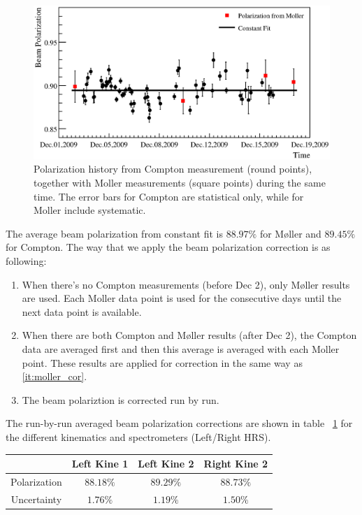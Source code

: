 \begin{figure}[!ht]
\centering
\includegraphics{RM/comptonpol.eps}
\caption{Polarization history from Compton measurement (round points), 
together with Moller measurements (square points) during the same time. 
The error bars for Compton are statistical only, while for Moller include systematic.}
\label{fig:compton}
\end{figure}

The average beam polarization from constant fit is $88.97\%$ for M{\o}ller and $89.45\%$ for Compton. 
The way that we apply the beam polarization correction is as following:

\begin{enumerate}
\item{ \label{it:moller_cor} When there's no Compton measurements (before Dec 2), 
only M{\o}ller results are used. Each Moller data point is used for the 
consecutive days until the next data point is available.}

\item{ When there are both Compton and M{\o}ller results (after Dec 2), 
the Compton data are averaged first and then this average is 
averaged with each Moller point. These results are applied 
for correction in the same way as \ref{it:moller_cor}.}

\item {The beam polariztion is corrected run by run. }
\end{enumerate}

The run-by-run averaged beam polarization corrections are shown in 
table ~\ref{tab:polarimeter} for the different kinematics and
spectrometers (Left/Right HRS).

\begin{table}[!ht]
  \begin{center}
    \begin{tabular}{c|c|c|c}
      \hline\hline
                    &  Left Kine 1   &    Left Kine 2    & Right Kine 2 \\ \hline
      Polarization  &  $88.18\%$      &    $89.29\%$       & $88.73\%$  \\ \hline
      Uncertainty   &  $1.76\%$      &    $1.19\%$       & $1.50\%$  \\ \hline
      \hline
    \end{tabular}
  \end{center}
\label{tab:polarimeter}
\end{table}


